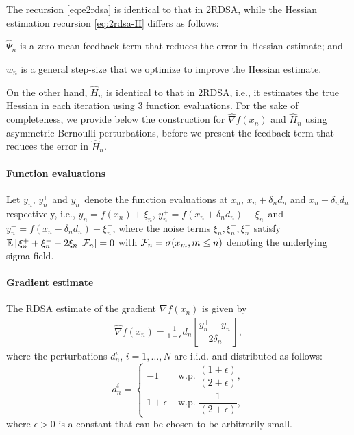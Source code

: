 \documentclass[letterpaper, 10 pt, conference]{ieeeconf}  %
\begin{document}
The recursion \eqref{eq:e2rdsa} is identical to that in 2RDSA, while the Hessian estimation recursion \eqref{eq:2rdsa-H} differs as follows:\\
\begin{inparaenum}[\bfseries (i)]
\item  $\widehat \Psi_n$ is a zero-mean feedback term that reduces the error in Hessian estimate; and\\
\item $w_n$ is a general step-size that we optimize to improve the Hessian estimate.
\end{inparaenum}

On the other hand, $\widehat H_n$ is identical to that in 2RDSA, i.e., it estimates the true Hessian in each iteration using $3$ function evaluations. %
For the sake of completeness, we provide below the construction for $\widehat\nabla f(x_n)$ and $\widehat H_n$ using asymmetric Bernoulli perturbations, before we present the feedback term that reduces the error in $\widehat H_n$.

\paragraph{Function evaluations}
Let $y_n$, $y_n^+$ and $y_n^-$ denote the function evaluations at $x_n$, $x_n+\delta_n d_n$ and $x_n - \delta_n d_n$ respectively, i.e., 
$y_n = f(x_n) + \xi_n$, $y_n^+ = f(x_n+\delta_n d_n) + \xi_n^+$ and 
$y_n^- = f(x_n-\delta_n d_n) + \xi_n^-$,
where the noise terms $\xi_n, \xi_n^+, \xi_n^-$ satisfy $\mathbb{E}\left[\left.\xi_n^+ + \xi_n^- - 2\xi_n \right| \mathcal{F}_n\right] = 0$ with $\mathcal{F}_n = \sigma(x_m,m\le n)$ denoting the underlying sigma-field.

\paragraph{Gradient estimate}
The RDSA estimate of the gradient $\nabla f(x_n)$ is given by
\begin{align}
\label{eq:grad-ber}
\widehat\nabla f(x_n) = \frac1{1+\epsilon} d_n \left[ \dfrac{y_n^+ - y_n^-}{2\delta_n}\right],
\end{align}
where the perturbations $d_n^i$, $i=1,\ldots,N$ are i.i.d. and distributed  as follows: 
\begin{equation}
\label{eq:det-proj}
 d_n^i =
  \begin{cases}
   -1 &  \text{ w.p. } \dfrac{(1+\epsilon)}{(2+\epsilon)}, \\
   1+\epsilon &  \text{ w.p. } \dfrac{1}{(2+\epsilon)},
  \end{cases}
\end{equation}
where $\epsilon>0$ is a constant that can be chosen to be arbitrarily small.
\end{document}
